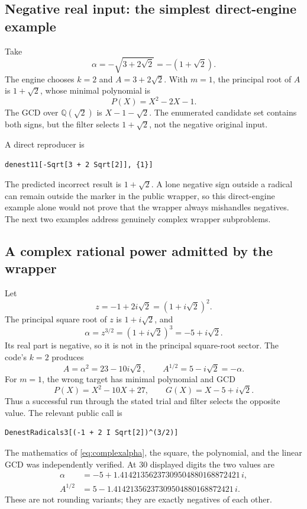 \documentclass[11pt,letterpaper]{article}
\newcommand{\Q}{\mathbb{Q}}
\theoremstyle{definition}
\begin{document}
\subsection{Negative real input: the simplest direct-engine example}
Take
\begin{equation}
 \alpha=-\sqrt{3+2\sqrt2}=-(1+\sqrt2).
\end{equation}
The engine chooses $k=2$ and $A=3+2\sqrt2$. With $m=1$, the principal root of $A$
is $1+\sqrt2$, whose minimal polynomial is
\begin{equation}
 P(X)=X^2-2X-1.
\end{equation}
The GCD over $\Q(\sqrt2)$ is $X-1-\sqrt2$. The enumerated candidate set contains
both signs, but the filter selects $1+\sqrt2$, not the negative original input.

A direct reproducer is
\begin{lstlisting}
denest11[-Sqrt[3 + 2 Sqrt[2]], {1}]
\end{lstlisting}
The predicted incorrect result is $1+\sqrt2$. A lone negative sign outside a
radical can remain outside the marker in the public wrapper, so this direct-engine
example alone would not prove that the wrapper always mishandles negatives. The
next two examples address genuinely complex wrapper subproblems.

\subsection{A complex rational power admitted by the wrapper}
Let
\begin{equation}
 z=-1+2i\sqrt2=(1+i\sqrt2)^2.
\end{equation}
The principal square root of $z$ is $1+i\sqrt2$, and
\begin{equation}\label{eq:complexalpha}
 \alpha=z^{3/2}=(1+i\sqrt2)^3=-5+i\sqrt2.
\end{equation}
Its real part is negative, so it is not in the principal square-root sector.
The code's $k=2$ produces
\begin{equation}
 A=\alpha^2=23-10i\sqrt2,\qquad
 A^{1/2}=5-i\sqrt2=-\alpha.
\end{equation}
For $m=1$, the wrong target has minimal polynomial and GCD
\begin{equation}
 P(X)=X^2-10X+27,\qquad G(X)=X-5+i\sqrt2.
\end{equation}
Thus a successful run through the stated trial and filter selects the opposite
value. The relevant public call is
\begin{lstlisting}
DenestRadicals3[(-1 + 2 I Sqrt[2])^(3/2)]
\end{lstlisting}
The mathematics of \eqref{eq:complexalpha}, the square, the polynomial, and the
linear GCD was independently verified. At 30 displayed digits the two values are
\begin{align*}
 \alpha&=-5+1.41421356237309504880168872421\,i,\\
 A^{1/2}&=5-1.41421356237309504880168872421\,i.
\end{align*}
These are not rounding variants; they are exactly negatives of each other.
\end{document}
